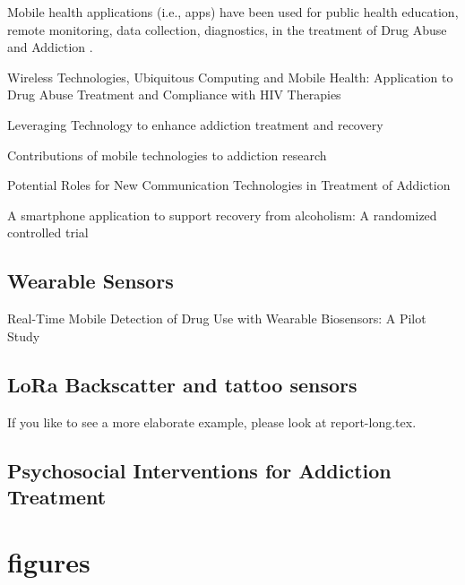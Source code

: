 \documentclass[sigconf]{acmart}
\begin{document}
Mobile health applications (i.e., apps) have been used for public health
education, remote monitoring, data collection, diagnostics, in the treatment
of Drug Abuse and Addiction \cite{boyer10}. 

Wireless Technologies, Ubiquitous Computing and Mobile Health: 
Application to Drug Abuse Treatment and Compliance with HIV Therapies
\cite{boyer10}


Leveraging Technology to enhance addiction treatment and recovery \cite{marsch12}

Contributions of mobile technologies to addiction research \cite{swedenson16}

Potential Roles for New Communication Technologies in Treatment of Addiction 
\cite{johnson11}

A smartphone application to support recovery from alcoholism: 
A randomized controlled trial
\cite{gustafson14}


\subsection{Wearable Sensors}

Real-Time Mobile Detection of Drug Use with Wearable Biosensors:
A Pilot Study
\cite{carreiro15}


\subsection{LoRa Backscatter and tattoo sensors}

If you like to see a more elaborate example, please look at
report-long.tex. 


\subsection{Psychosocial Interventions for Addiction Treatment}









\section{figures}
\end{document}
